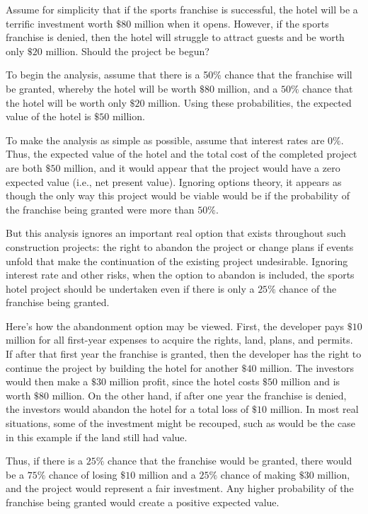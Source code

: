\documentclass[11pt]{article}
\begin{document}
Assume for simplicity that if the sports franchise is successful, the hotel will be a terrific investment worth $\$ 80$ million when it opens. However, if the sports franchise is denied, then the hotel will struggle to attract guests and be worth only $\$ 20$ million. Should the project be begun?

To begin the analysis, assume that there is a 50\% chance that the franchise will be granted, whereby the hotel will be worth $\$ 80$ million, and a $50 \%$ chance that the hotel will be worth only $\$ 20$ million. Using these probabilities, the expected value of the hotel is $\$ 50$ million.

To make the analysis as simple as possible, assume that interest rates are $0 \%$. Thus, the expected value of the hotel and the total cost of the completed project are both $\$ 50$ million, and it would appear that the project would have a zero expected value (i.e., net present value). Ignoring options theory, it appears as though the only way this project would be viable would be if the probability of the franchise being granted were more than $50 \%$.

But this analysis ignores an important real option that exists throughout such construction projects: the right to abandon the project or change plans if events unfold that make the continuation of the existing project undesirable. Ignoring interest rate and other risks, when the option to abandon is included, the sports hotel project should be undertaken even if there is only a $25 \%$ chance of the franchise being granted.

Here's how the abandonment option may be viewed. First, the developer pays $\$ 10$ million for all first-year expenses to acquire the rights, land, plans, and permits. If after that first year the franchise is granted, then the developer has the right to continue the project by building the hotel for another $\$ 40$ million. The investors would then make a $\$ 30$ million profit, since the hotel costs $\$ 50$ million and is worth $\$ 80$ million. On the other hand, if after one year the franchise is denied, the investors would abandon the hotel for a total loss of $\$ 10$ million. In most real situations, some of the investment might be recouped, such as would be the case in this example if the land still had value.

Thus, if there is a $25 \%$ chance that the franchise would be granted, there would be a $75 \%$ chance of losing $\$ 10$ million and a $25 \%$ chance of making $\$ 30$ million, and the project would represent a fair investment. Any higher probability of the franchise being granted would create a positive expected value.
\end{document}
